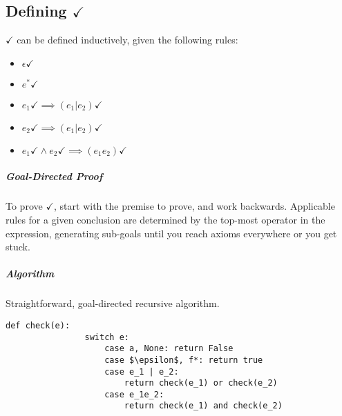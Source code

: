 \documentclass[11pt]{article}
\begin{document}
	\subsection{Defining $\checkmark$}
		$\checkmark$ can be defined inductively, given the following rules:
		\begin{itemize}
			\item $\epsilon\checkmark$
			\item $e^*\checkmark$
			\item $e_1\checkmark \implies (e_1 | e_2)\checkmark$
			\item $e_2\checkmark \implies (e_1 | e_2)\checkmark$
			\item $e_1\checkmark \wedge e_2\checkmark \implies (e_1e_2)\checkmark$
		\end{itemize}
		
		\subparagraph{Goal-Directed Proof} To prove $\checkmark$, start with the premise to prove, and work backwards. Applicable rules for a given conclusion are determined by the top-most operator in the expression, generating sub-goals until you reach axioms everywhere or you get stuck.
		
		\subparagraph{Algorithm} Straightforward, goal-directed recursive algorithm.
		\begin{lstlisting}[autogobble=true,mathescape]
			def check(e):
				switch e:
					case a, None: return False
					case $\epsilon$, f*: return true
					case e_1 | e_2:
						return check(e_1) or check(e_2)
					case e_1e_2:
						return check(e_1) and check(e_2)
		\end{lstlisting}
		
\end{document}
